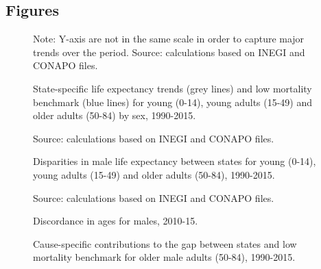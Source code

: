 \documentclass{bmcart}
\begin{document}
\begin{backmatter}



\section*{Figures}

\begin{figure}[h!]
\centering
\caption{State-specific life expectancy trends (grey lines) and low mortality benchmark (blue lines) for young (0-14), young adults (15-49) and older adults (50-84) by sex, 1990-2015.}
\label{Fig1}


Note: Y-axis are not in the same scale in order to capture major trends over the period. Source: calculations based on INEGI and CONAPO files. 
\end{figure}



\begin{figure}[h!]
\centering
\caption{Disparities in male life expectancy between states for young (0-14), young adults (15-49) and older adults (50-84), 1990-2015.}
\label{Fig2}

Source: calculations based on INEGI and CONAPO files. 
\end{figure}

\begin{figure}[h!]
\centering
\caption{Discordance in ages for males, 2010-15.}
\label{Fig3}

Source: calculations based on INEGI and CONAPO files. 
\end{figure}



\begin{figure}[h!]
\centering
\caption{Cause-specific contributions to the gap between states and low mortality benchmark for older male adults (50-84), 1990-2015.}
\label{Fig4}


\end{figure}
\end{backmatter}
\end{document}
